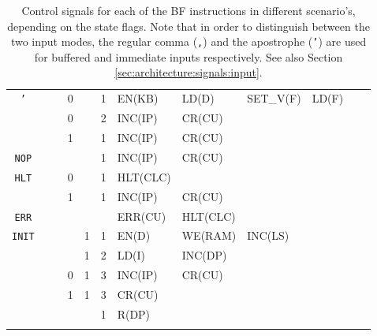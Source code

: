 \begin{longtable}[c] {c|cccc|c|llllll}
    \rowcolor{Gray}   \texttt{'}  &   &   & 0     &      & 1     & EN(KB)   & LD(D)    & SET\_V(F)& LD(F)  &        &        \\
    \rowcolor{Gray}               &   &   & 0     &      & 2     & INC(IP)  & CR(CU)   &         &        &        &        \\
    \rowcolor{White}              &   &   & 1     &      & 1     & INC(IP)  & CR(CU)   &         &        &        &        \\ \hline
    
    \rowcolor{Gray}  \texttt{NOP} &   &   &       &      & 1     & INC(IP)  & CR(CU)   &         &        &        &        \\ \hline
    \rowcolor{White} \texttt{HLT} &   &   & 0     &      & 1     & HLT(CLC) &          &         &        &        &        \\ 
    \rowcolor{Gray}               &   &   & 1     &      & 1     & INC(IP)  & CR(CU)   &         &        &        &        \\ \hline        
    \rowcolor{White} \texttt{ERR} &   &   &       &      &       & ERR(CU)  & HLT(CLC) &         &        &        &        \\ \hline
    \rowcolor{Gray}  \texttt{INIT}&   &   &       & 1    & 1     & EN(D)    & WE(RAM)  & INC(LS) &        &        &        \\
    \rowcolor{Gray}               &   &   &       & 1    & 2     & LD(I)    & INC(DP)  &         &        &        &        \\
    \rowcolor{Gray}               &   &   & 0     & 1    & 3     & INC(IP)  & CR(CU)   &         &        &        &        \\
    \rowcolor{White}              &   &   & 1     & 1    & 3     & CR(CU)   &          &         &        &        &        \\ \hline
    \rowcolor{Gray}               &   &   &       &      & 1     & R(DP)     &          &         &        &        &        \\ \hline
    

    \caption{Control signals for each of the BF instructions in different scenario's, depending on the state flags. Note that in order to distinguish between the two input modes, the regular comma (\texttt{,}) and the apostrophe (\texttt{'}) are used for buffered and immediate inputs respectively. See also Section \ref{sec:architecture:signals:input}.}
    \label{tab:microcode}
  \end{longtable}
